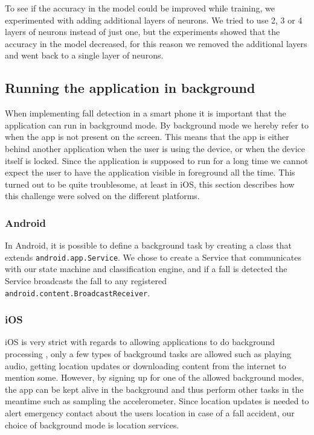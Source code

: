 \documentclass[12pt, a4paper, onecolumn]{article}
\begin{document}
	To see if the accuracy in the model could be improved while training, we experimented with adding additional layers of neurons. We tried to use 2, 3 or 4 layers of neurons instead of just one, but the experiments showed that the accuracy in the model decreased, for this reason we removed the additional layers and went back to a single layer of neurons.
	
	
	
	
	
	
	\subsection{Running the application in background}
	
	When implementing fall detection in a smart phone it is important that the application can run in background mode. By background mode we hereby refer to when the app is not present on the screen. This means that the app is either behind another application when the user is using the device, or when the device itself is locked. Since the application is supposed to run for a long time we cannot expect the user to have the application visible in foreground all the time. This turned out to be quite troublesome, at least in iOS, this section describes how this challenge were solved on the different platforms.
	
	\subsubsection{Android}
	
	In Android, it is possible to define a background task by creating a class that extends \texttt{android.app.Service}. We chose to create a Service that communicates with our state machine and classification engine, and if a fall is  detected the Service broadcasts the fall to any registered \\ \texttt{android.content.BroadcastReceiver}.
	
	\subsubsection{iOS}
	iOS is very strict with regards to allowing applications to do background processing , only a few types of background tasks are allowed such as playing audio, getting location updates or downloading content from the internet to mention some. However, by signing up for one of the allowed background modes, the app can be kept alive in the background and thus perform other tasks in the meantime such as sampling the accelerometer. Since location updates is needed to alert emergency contact about the users location in case of a fall accident, our choice of background mode is location services.
	
\end{document}
